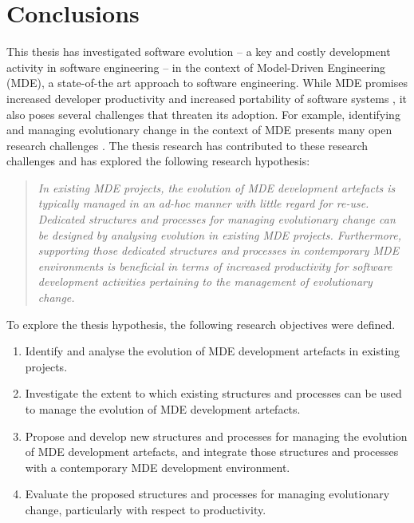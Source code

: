 
\chapter{Conclusions}
\label{Conclusion}

This thesis has investigated software evolution -- a key and costly development activity in software engineering \cite{moad90maintaining} -- in the context of Model-Driven Engineering (MDE), a state-of-the art approach to software engineering. While MDE promises increased developer productivity \cite{watson08mdahistory} and increased portability of software systems \cite{frankel02mda}, it also poses several challenges that threaten its adoption. For \cc example, identifying and managing evolutionary change in the context of MDE presents many open research challenges \cite{Mens07}. The thesis research has contributed to these research challenges and has explored the following research hypothesis:

\begin{quote}
\emph{In existing MDE projects, the evolution of MDE development artefacts is typically managed in an ad-hoc manner with little regard for re-use. Dedicated structures and processes for managing evolutionary change can be designed by analysing evolution in existing MDE projects. Furthermore, supporting those dedicated structures and processes in contemporary MDE environments is beneficial in terms of increased productivity for software development activities pertaining to the management of evolutionary change.}
\end{quote} 

To explore the thesis hypothesis, the following research objectives were defined.

\begin{enumerate}
	\item Identify and analyse the evolution of MDE development artefacts in existing projects.
	\item Investigate the extent to which existing structures and processes can be used to manage the evolution of MDE development artefacts. 
	\item Propose and develop new structures and processes for managing the evolution of MDE development artefacts, and integrate those structures and processes with a contemporary MDE development environment.
	\item Evaluate the proposed structures and processes for managing evolutionary change, particularly with respect to productivity.
\end{enumerate}

